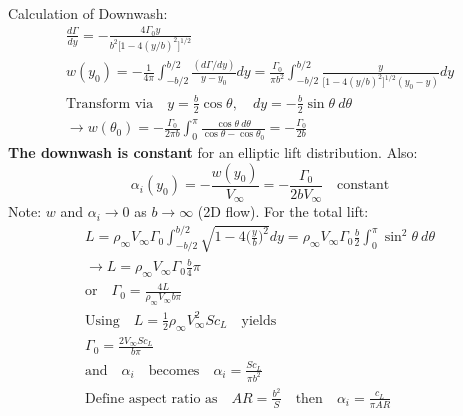 \documentclass[draft=false, titlepage]{article}
\begin{document}
\paragraph*{} Calculation of Downwash:
\begin{gather*}
    \frac{d\Gamma}{dy} = -\frac{4\Gamma_0 y}{b^2 \big[ 1-4(y/b)^2 \big]^{1/2}}\\
    w(y_0) = -\frac{1}{4\pi} \int_{-b/2}^{b/2} \frac{(d\Gamma/dy)}{y-y_0}dy = \frac{\Gamma_0}{\pi b^2} \int_{-b/2}^{b/2} \frac{y}{\big[ 1-4(y/b)^2 \big]^{1/2} (y_0-y)}dy\\
    \text{Transform via} \quad y = \frac{b}{2}\cos\theta,\quad dy = -\frac{b}{2}\sin\theta\ d\theta\\
    \rightarrow w(\theta_0) = -\frac{\Gamma_0}{2\pi b} \int_0^\pi \frac{\cos\theta\ d\theta}{\cos\theta - \cos\theta_0} = -\frac{\Gamma_0}{2b}
\end{gather*}
\textbf{The downwash is constant} for an elliptic lift distribution. Also:
\begin{equation*}
    \alpha_i(y_0) = -\frac{w(y_0)}{V_\infty} = -\frac{\Gamma_0}{2bV_\infty} \quad \text{constant}
\end{equation*}
Note: $w$ and $\alpha_i \rightarrow 0$ as $b\rightarrow \infty$ (2D flow). For the total lift:
\begin{gather*}
    L = \rho_\infty V_\infty \Gamma_0 \int_{-b/2}^{b/2} \sqrt{1-4\Big(\frac{y}{b}\Big)^2} dy = \rho_\infty V_\infty \Gamma_0 \frac{b}{2} \int_0^\pi \sin^2\theta\ d\theta\\
    \rightarrow  L = \rho_\infty V_\infty \Gamma_0 \frac{b}{4}\pi\\
    \text{or} \quad \Gamma_0 = \frac{4L}{\rho_\infty V_\infty b\pi}\\
    \text{Using} \quad L = \frac{1}{2}\rho_\infty V_\infty^2 Sc_L \quad \text{yields}\\
    \Gamma_0 = \frac{2 V_\infty S c_L}{b\pi}\\
    \text{and} \quad \alpha_i \quad \text{becomes} \quad \alpha_i = \frac{Sc_L}{\pi b^2}\\
    \text{Define aspect ratio as} \quad AR = \frac{b^2}{S} \quad \text{then} \quad \alpha_i = \frac{c_L}{\pi AR}\\
\end{gather*}
\end{document}
